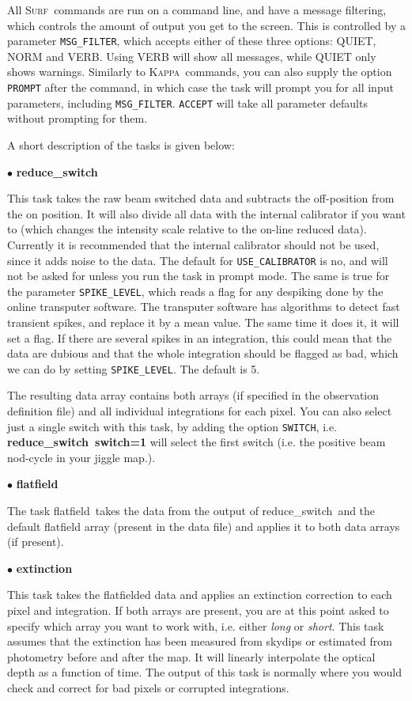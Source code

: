 \documentclass[twoside,11pt]{article}
\newcommand{\Kappa}{\xref{\textsc{Kappa}}{sun95}{}}
\newcommand{\surf}{\xref{\textsc{Surf}}{sun216}{}}
\newcommand{\task}[1]{\textsf{#1}}
\newcommand{\param}[1]{\texttt{#1}}
\newcommand{\resw}{\xref{\task{reduce\_switch}}{sun216}{REDUCE_SWITCH}}
\newcommand{\flatf}{\xref{\task{flatfield}}{sun216}{FLATFIELD}}
\newcommand{\ext}{\xref{\task{extinction}}{sun216}{EXTINCTION}}
\newcommand{\xref}[3]{#1}
\begin{document}
All \surf\ commands are run on a command line, and have a message filtering,
which controls the amount of output you get to the screen. This is
controlled by a parameter \param{MSG\_FILTER}, which accepts either of these
three options: QUIET, NORM and VERB. Using VERB will show all messages,
while QUIET only shows warnings. Similarly to \Kappa\ commands, you can
also supply the option \param{PROMPT} after the command, in which case the task
will prompt you for all input parameters, including \param{MSG\_FILTER}. 
\param{ACCEPT} will take all parameter defaults without prompting for them.

A short description of the tasks is given below:

$\bullet$ \textbf{\resw}

This task takes the raw beam switched data and subtracts the off-position
from the on position. It will also divide all data with the internal
calibrator if you want to (which changes the intensity scale relative to
the on-line reduced data). Currently it is recommended that the internal
calibrator should not be used, since it adds noise to the data. The
default for \param{USE\_CALIBRATOR} is no, and will not be asked for unless
you run the task in prompt mode. The same is true for the parameter
\param{SPIKE\_LEVEL}, which reads a flag for any despiking done by the online
transputer software. The transputer software has algorithms to detect fast
transient spikes, and replace it by a mean value. The same time it does
it, it will set a flag. If there are several spikes in an integration,
this could mean that the data are dubious and that the whole integration
should be flagged as bad, which we can do by setting \param{SPIKE\_LEVEL}. The
default is 5. 

The resulting data array contains both arrays (if specified in the
observation definition file) and all individual integrations for each
pixel. You can also select just a single switch with this task, by adding
the option \param{SWITCH}, i.e. \textbf{ \resw\ switch=1} will select the
first switch (i.e. the positive beam nod-cycle in your jiggle map.).

$\bullet$ \textbf{\flatf}

The task \flatf\ takes the data from the output of \resw\
and the default flatfield array (present in the data
file) and applies it to both data arrays (if present).

$\bullet$ \textbf{\ext}

This task takes the flatfielded data and applies an extinction correction to
each pixel and integration. If both arrays are present, you are at this point
asked to specify which array you want to work with, i.e.  either {\it long} or
{\it short}.  This task assumes that the extinction has been measured from
\xref{skydips}{sun216}{skydips} \cite{skydip} or estimated from photometry
before and after the map. It will linearly interpolate the optical depth as a
function of time.  The output of this task is normally where you would check
and correct for bad pixels or corrupted integrations.
\end{document}

